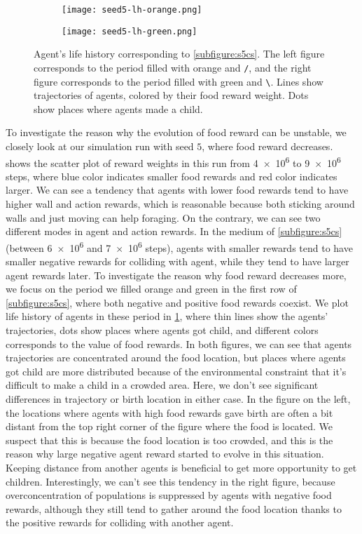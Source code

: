 \begin{figure}[t]
  \begin{subfigure}[t]{7cm}
    \centering
    \texttt{[image: seed5-lh-orange.png]}
  \end{subfigure}
  \begin{subfigure}[t]{7cm}
    \centering
    \texttt{[image: seed5-lh-green.png]}
  \end{subfigure}
  \caption{
    Agent's life history corresponding to \cref{subfigure:s5cs}. The left figure corresponds to the period filled with orange and \texttt{/}, and the right figure corresponds to the period filled with green and \texttt{\textbackslash}. Lines show trajectories of agents, colored by their food reward weight. Dots show places where agents made a child.
  }\label{figure:s5-lh}
\end{figure}

To investigate the reason why the evolution of food reward can be unstable, we closely look at our simulation run with seed $5$, where food reward decreases.  shows the scatter plot of reward weights in this run from \num{4e6} to \num{9e6} steps, where blue color indicates smaller food rewards and red color indicates larger. We can see a tendency that agents with lower food rewards tend to have higher wall and action rewards, which is reasonable because both sticking around walls and just moving can help foraging. On the contrary, we can see two different modes in agent and action rewards. In the medium of \cref{subfigure:s5cs} (between \num{6e6} and \num{7e6} steps), agents with smaller rewards tend to have smaller negative rewards for colliding with agent, while they tend to have larger agent rewards later. To investigate the reason why food reward decreases more, we focus on the period we filled orange and green in the first row of \cref{subfigure:s5cs}, where both negative and positive food rewards coexist. We plot life history of agents in these period in \cref{figure:s5-lh}, where thin lines show the agents' trajectories, dots show places where agents got child, and different colors corresponds to the value of food rewards. In both figures, we can see that agents trajectories are concentrated around the food location, but places where agents got child are more distributed because of the environmental constraint that it's difficult to make a child in a crowded area. Here, we don't see significant differences in trajectory or birth location in either case. In the figure on the left, the locations where agents with high food rewards gave birth are often a bit distant from the top right corner of the figure where the food is located. We suspect that this is because the food location is too crowded, and this is the reason why large negative agent reward started to evolve in this situation. Keeping distance from another agents is beneficial to get more opportunity to get children. Interestingly, we can't see this tendency in the right figure, because overconcentration of populations is suppressed by agents with negative food rewards, although they still tend to gather around the food location thanks to the positive rewards for colliding with another agent.

